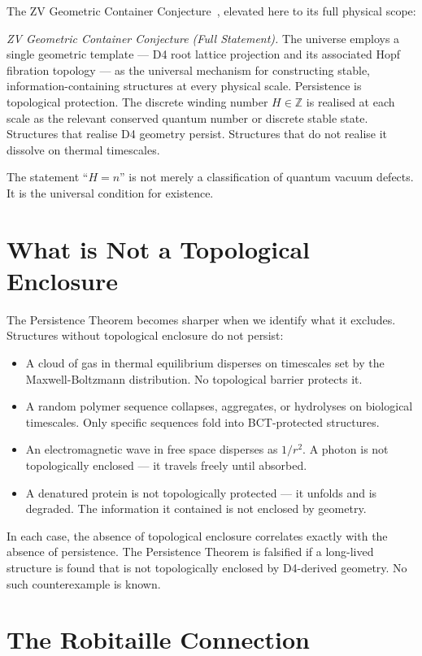 \documentclass[aps,prl,preprint,superscriptaddress,floatfix]{revtex4-2}
\begin{document}
The ZV Geometric Container Conjecture~\cite{zv2026}, elevated here
to its full physical scope:

\textit{ZV Geometric Container Conjecture (Full Statement).}
The universe employs a single geometric template --- D4 root lattice
projection and its associated Hopf fibration topology --- as the
universal mechanism for constructing stable, information-containing
structures at every physical scale. Persistence is topological
protection. The discrete winding number $H \in \mathbb{Z}$ is
realised at each scale as the relevant conserved quantum number or
discrete stable state. Structures that realise D4 geometry persist.
Structures that do not realise it dissolve on thermal timescales.

The statement ``$H = n$'' is not merely a classification of quantum
vacuum defects. It is the universal condition for existence.

\section{What is Not a Topological Enclosure}

The Persistence Theorem becomes sharper when we identify what it
excludes. Structures without topological enclosure do not persist:

\begin{itemize}
\item A cloud of gas in thermal equilibrium disperses on timescales
  set by the Maxwell-Boltzmann distribution. No topological barrier
  protects it.
\item A random polymer sequence collapses, aggregates, or
  hydrolyses on biological timescales. Only specific sequences
  fold into BCT-protected structures.
\item An electromagnetic wave in free space disperses as $1/r^2$.
  A photon is not topologically enclosed --- it travels freely
  until absorbed.
\item A denatured protein is not topologically protected ---
  it unfolds and is degraded. The information it contained
  is not enclosed by geometry.
\end{itemize}

In each case, the absence of topological enclosure correlates
exactly with the absence of persistence. The Persistence Theorem
is falsified if a long-lived structure is found that is not
topologically enclosed by D4-derived geometry. No such counterexample
is known.

\section{The Robitaille Connection}
\end{document}
